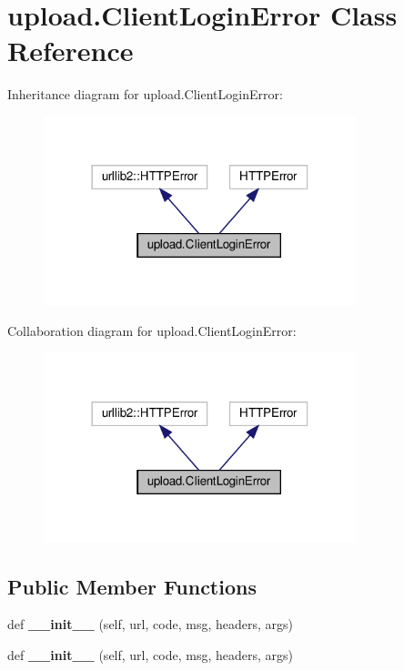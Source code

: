 \hypertarget{classupload_1_1_client_login_error}{}\section{upload.\+Client\+Login\+Error Class Reference}
\label{classupload_1_1_client_login_error}


Inheritance diagram for upload.\+Client\+Login\+Error\+:
\nopagebreak
\begin{figure}[H]
\begin{center}
\leavevmode
\includegraphics[width=258pt]{classupload_1_1_client_login_error__inherit__graph}
\end{center}
\end{figure}


Collaboration diagram for upload.\+Client\+Login\+Error\+:
\nopagebreak
\begin{figure}[H]
\begin{center}
\leavevmode
\includegraphics[width=258pt]{classupload_1_1_client_login_error__coll__graph}
\end{center}
\end{figure}
\subsection*{Public Member Functions}
\begin{DoxyCompactItemize}
\item 
\mbox{\label{classupload_1_1_client_login_error_a1e590616c2976d881e155958cedbbe47}} 
def {\bfseries \+\_\+\+\_\+init\+\_\+\+\_\+} (self, url, code, msg, headers, args)
\item 
\mbox{\label{classupload_1_1_client_login_error_a1e590616c2976d881e155958cedbbe47}} 
def {\bfseries \+\_\+\+\_\+init\+\_\+\+\_\+} (self, url, code, msg, headers, args)
\end{DoxyCompactItemize}
